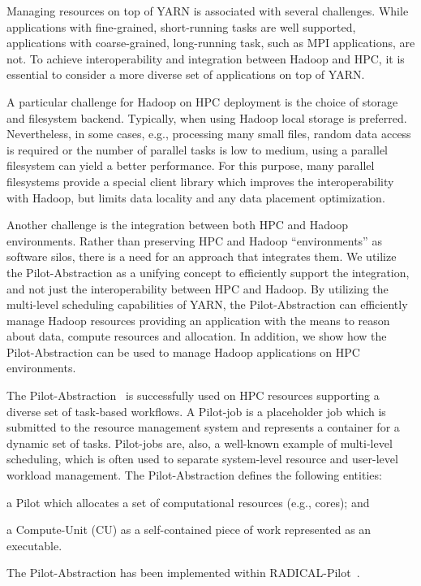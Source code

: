 Managing resources on top of YARN is associated with several challenges.
While applications with fine-grained, short-running tasks are well supported, applications with coarse-grained, long-running task, such as MPI applications, are not.
To achieve interoperability and integration between Hadoop and HPC, it is essential to consider a more diverse set of applications on top of YARN.

A particular challenge for Hadoop on HPC deployment is the choice of storage and filesystem backend.
Typically, when using Hadoop local storage is preferred.
Nevertheless, in some cases, e.g., processing many small files, random data access is required or the number of parallel tasks is low to medium, using a parallel filesystem can yield a better performance.
For this purpose, many parallel filesystems provide a special client library which improves the interoperability with Hadoop, but limits data locality and any data placement optimization.

Another challenge is the integration between both HPC and Hadoop environments.
Rather than preserving HPC and Hadoop ``environments'' as software silos, there is a need for an approach that integrates them. 
We utilize the Pilot-Abstraction as a unifying concept to efficiently support the integration, and not just the interoperability between HPC and Hadoop.
By utilizing the multi-level scheduling capabilities of YARN, the Pilot-Abstraction can efficiently manage Hadoop resources providing an application with the means to reason about data, compute resources and allocation.
In addition, we show how the Pilot-Abstraction can be used to manage Hadoop applications on HPC environments.

The Pilot-Abstraction~\cite{luckow2012pstar} is successfully used on HPC resources supporting a diverse set of task-based workflows.
A Pilot-job is a placeholder job which is submitted to the resource management system and represents a container for a dynamic set of tasks.
Pilot-jobs are, also, a well-known example of multi-level scheduling, which is often used to separate system-level resource and user-level workload management.
The Pilot-Abstraction defines the following entities:
\begin{inparaenum} [1)]
    \item a Pilot which allocates a set of computational resources (e.g., cores); and
    \item  a Compute-Unit (CU) as a self-contained piece of work represented as an executable.
\end{inparaenum}
The Pilot-Abstraction has been implemented within RADICAL-Pilot~\cite{merzky2018design}.


